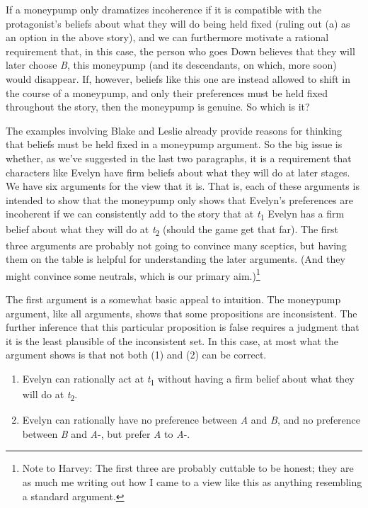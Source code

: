 \documentclass[
  11pt,
  letterpaper,
  DIV=11,
  numbers=noendperiod,
  twoside]{scrartcl}
\providecommand{\tightlist}{%
  \setlength{\itemsep}{0pt}\setlength{\parskip}{0pt}}\usepackage{longtable,booktabs,array}
\begin{document}
If a moneypump only dramatizes incoherence if it is compatible with the
protagonist's beliefs about what they will do being held fixed (ruling
out (a) as an option in the above story), and we can furthermore
motivate a rational requirement that, in this case, the person who goes
Down believes that they will later choose \emph{B}, this moneypump (and
its descendants, on which, more soon) would disappear. If, however,
beliefs like this one are instead allowed to shift in the course of a
moneypump, and only their preferences must be held fixed throughout the
story, then the moneypump is genuine. So which is it?

The examples involving Blake and Leslie already provide reasons for
thinking that beliefs must be held fixed in a moneypump argument. So the
big issue is whether, as we've suggested in the last two paragraphs, it
is a requirement that characters like Evelyn have firm beliefs about
what they will do at later stages. We have six arguments for the view
that it is. That is, each of these arguments is intended to show that
the moneypump only shows that Evelyn's preferences are incoherent if we
can consistently add to the story that at \emph{t}\textsubscript{1}
Evelyn has a firm belief about what they will do at
\emph{t}\textsubscript{2} (should the game get that far). The first
three arguments are probably not going to convince many sceptics, but
having them on the table is helpful for understanding the later
arguments. (And they might convince some neutrals, which is our primary
aim.)\footnote{Note to Harvey: The first three are probably cuttable to
  be honest; they are as much me writing out how I came to a view like
  this as anything resembling a standard argument.}

The first argument is a somewhat basic appeal to intuition. The
moneypump argument, like all arguments, shows that some propositions are
inconsistent. The further inference that this particular proposition is
false requires a judgment that it is the least plausible of the
inconsistent set. In this case, at most what the argument shows is that
not both (1) and (2) can be correct.

\begin{enumerate}
\def\labelenumi{\arabic{enumi}.}
\tightlist
\item
  Evelyn can rationally act at \emph{t}\textsubscript{1} without having
  a firm belief about what they will do at \emph{t}\textsubscript{2}.
\item
  Evelyn can rationally have no preference between \emph{A} and
  \emph{B}, and no preference between \emph{B} and \emph{A}-, but prefer
  \emph{A} to \emph{A}-.
\end{enumerate}
\end{document}
